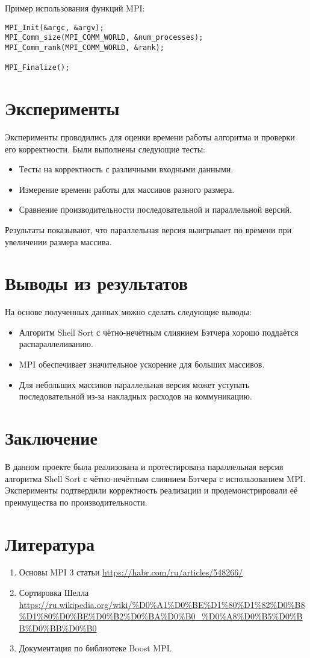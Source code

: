 \documentclass[a4paper,12pt]{article}
\begin{document}
Пример использования функций MPI:
\begin{lstlisting}
MPI_Init(&argc, &argv);
MPI_Comm_size(MPI_COMM_WORLD, &num_processes);
MPI_Comm_rank(MPI_COMM_WORLD, &rank);

MPI_Finalize();
\end{lstlisting}

\section{Эксперименты}
Эксперименты проводились для оценки времени работы алгоритма и проверки его корректности. Были выполнены следующие тесты:
\begin{itemize}
    \item Тесты на корректность с различными входными данными.
    \item Измерение времени работы для массивов разного размера.
    \item Сравнение производительности последовательной и параллельной версий.
\end{itemize}

Результаты показывают, что параллельная версия выигрывает по времени при увеличении размера массива.

\section{Выводы из результатов}
На основе полученных данных можно сделать следующие выводы:
\begin{itemize}
    \item Алгоритм Shell Sort с чётно-нечётным слиянием Бэтчера хорошо поддаётся распараллеливанию.
    \item MPI обеспечивает значительное ускорение для больших массивов.
    \item Для небольших массивов параллельная версия может уступать последовательной из-за накладных расходов на коммуникацию.
\end{itemize}

\section{Заключение}
В данном проекте была реализована и протестирована параллельная версия алгоритма Shell Sort с чётно-нечётным слиянием Бэтчера с использованием MPI. Эксперименты подтвердили корректность реализации и продемонстрировали её преимущества по производительности.

\section{Литература}
\begin{enumerate}
    \item Основы MPI 3 статьи \url{https://habr.com/ru/articles/548266/}
    \item Сортировка Шелла \url{https://ru.wikipedia.org/wiki/%D0%A1%D0%BE%D1%80%D1%82%D0%B8%D1%80%D0%BE%D0%B2%D0%BA%D0%B0_%D0%A8%D0%B5%D0%BB%D0%BB%D0%B0}
    \item Документация по библиотеке Boost MPI.
\end{enumerate}
\end{document}
